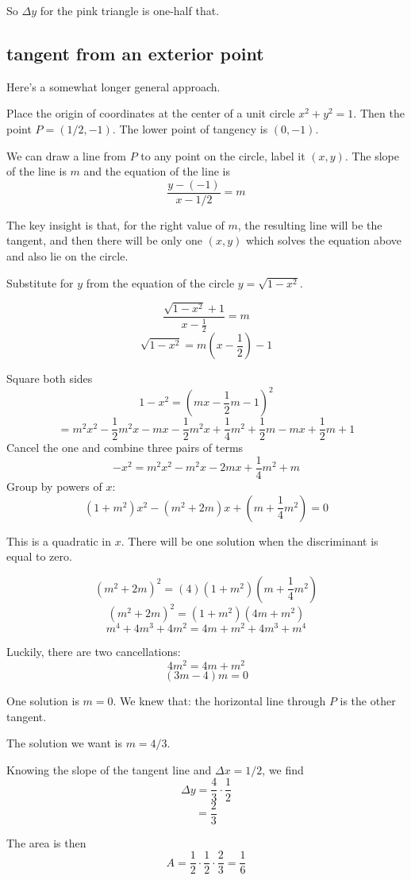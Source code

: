 \documentclass[11pt, oneside]{article}
\begin{document}
So $\Delta y$ for the pink triangle is one-half that.

\subsection*{tangent from an exterior point}

Here's a somewhat longer general approach.

Place the origin of coordinates at the center of a unit circle $x^2 + y^2 = 1$.  Then the point $P = (1/2,-1)$.  The lower point of tangency is $(0,-1)$.

We can draw a line from $P$ to any point on the circle, label it $(x,y)$.  The slope of the line
is $m$ and the equation of the line is
\[ \frac{y - (-1)}{x - 1/2} = m \]

The key insight is that, for the right value of $m$, the resulting line will be the tangent, and then there will be only one $(x,y)$ which solves the equation above and also lie on the circle.  

Substitute for $y$ from the equation of the circle $y = \sqrt{1 - x^2}$.

\[ \frac{\sqrt{1 - x^2} + 1}{x - \frac{1}{2}} = m \]
\[ \sqrt{1 - x^2} = m(x - \frac{1}{2}) - 1 \]

Square both sides
\[ 1 - x^2 = (mx - \frac{1}{2}m - 1)^2 \]
\[ = m^2 x^2 - \frac{1}{2}m^2x - mx - \frac{1}{2}m^2x +  \frac{1}{4}m^2 + \frac{1}{2}m - mx + \frac{1}{2}m + 1   \]
Cancel the one and combine three pairs of terms
\[ -  x^2 = m^2 x^2 - m^2x - 2mx  +  \frac{1}{4}m^2 + m   \]
Group by powers of $x$:
\[ (1 + m^2)x^2 - (m^2 + 2m)x + (m + \frac{1}{4}m^2)  = 0 \]

This is a quadratic in $x$.  There will be one solution when the discriminant is equal to zero.

\[ (m^2 + 2m)^2 = (4)(1 + m^2)(m + \frac{1}{4}m^2) \]
\[ (m^2 + 2m)^2 = (1 + m^2)(4m + m^2) \]
\[ m^4 + 4m^3 + 4m^2 = 4m + m^2 + 4m^3 + m^4 \]

Luckily, there are two cancellations:
\[ 4m^2 = 4m + m^2 \]
\[ (3m - 4)m = 0 \]

One solution is $m=0$.  We knew that:  the horizontal line through $P$ is the other tangent.  

The solution we want is $m = 4/3$.

Knowing the slope of the tangent line and $\Delta x = 1/2$, we find
\[ \Delta y = \frac{4}{3} \cdot \frac{1}{2} \]
\[ = \frac{2}{3} \]

The area is then
\[ A = \frac{1}{2} \cdot \frac{1}{2} \cdot \frac{2}{3} = \frac{1}{6}  \]
\end{document}
